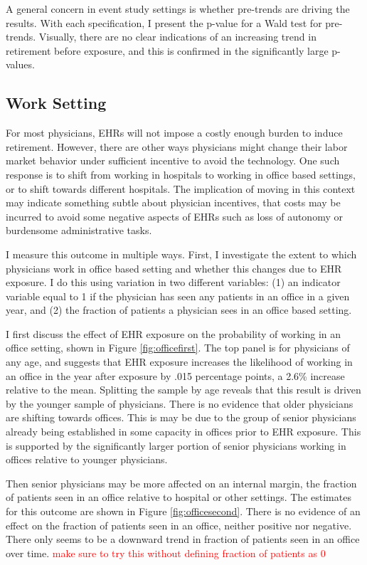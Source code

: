 \documentclass[11pt]{article}
\begin{document}
A general concern in event study settings is whether pre-trends are driving the results. With each specification, I present the p-value for a Wald test for pre-trends. Visually, there are no clear indications of an increasing trend in retirement before exposure, and this is confirmed in the significantly large p-values.


\subsection{Work Setting}

For most physicians, EHRs will not impose a costly enough burden to induce retirement. However, there are other ways physicians might change their labor market behavior under sufficient incentive to avoid the technology. One such response is to shift from working in hospitals to working in office based settings, or to shift towards different hospitals. The implication of moving in this context may indicate something subtle about physician incentives, that costs may be incurred to avoid some negative aspects of EHRs such as loss of autonomy or burdensome administrative tasks.

I measure this outcome in multiple ways. First, I investigate the extent to which physicians work in office based setting and whether this changes due to EHR exposure. I do this using variation in two different variables: (1) an indicator variable equal to 1 if the physician has seen any patients in an office in a given year, and (2) the fraction of patients a physician sees in an office based setting. 

I first discuss the effect of EHR exposure on the probability of working in an office setting, shown in Figure \ref{fig:officefirst}. The top panel is for physicians of any age, and suggests that EHR exposure increases the likelihood of working in an office in the year after exposure by .015 percentage points, a 2.6\% increase relative to the mean. Splitting the sample by age reveals that this result is driven by the younger sample of physicians. There is no evidence that older physicians are shifting towards offices. This is may be due to the group of senior physicians already being established in some capacity in offices prior to EHR exposure. This is supported by the significantly larger portion of senior physicians working in offices relative to younger physicians. 

Then senior physicians may be more affected on an internal margin, the fraction of patients seen in an office relative to hospital or other settings. The estimates for this outcome are shown in Figure \ref{fig:officesecond}. There is no evidence of an effect on the fraction of patients seen in an office, neither positive nor negative. There only seems to be a downward trend in fraction of patients seen in an office over time. \textcolor{red}{make sure to try this without defining fraction of patients as 0}
\end{document}
